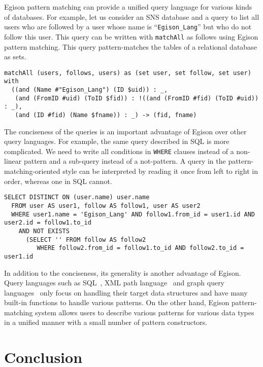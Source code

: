\documentclass{article}
\begin{document}
Egison pattern matching can provide a unified query language for various kinds of databases.
For example, let us consider an SNS database and a query to list all users who are followed by a user whose name is ``\verb|Egison_Lang|'' but who do not follow this user.
This query can be written with \texttt{matchAll} as follows using Egison pattern matching.
This query pattern-matches the tables of a relational database as sets.

\begin{lstlisting}[language=egison]
matchAll (users, follows, users) as (set user, set follow, set user) with
  ((and (Name #"Egison_Lang") (ID $uid)) : _,
   (and (FromID #uid) (ToID $fid)) : !((and (FromID #fid) (ToID #uid)) : _),
   (and (ID #fid) (Name $fname)) : _) -> (fid, fname)
\end{lstlisting}

The conciseness of the queries is an important advantage of Egison over other query languages.
For example, the same query described in SQL is more complicated.
We need to write all conditions in \texttt{WHERE} clauses instead of a non-linear pattern and a sub-query instead of a not-pattern.
A query in the pattern-matching-oriented style can be interpreted by reading it once from left to right in order, whereas one in SQL cannot.

\begin{lstlisting}[language=egison]
SELECT DISTINCT ON (user.name) user.name
  FROM user AS user1, follow AS follow1, user AS user2
  WHERE user1.name = 'Egison_Lang' AND follow1.from_id = user1.id AND user2.id = follow1.to_id
    AND NOT EXISTS
      (SELECT '' FROM follow AS follow2
         WHERE follow2.from_id = follow1.to_id AND follow2.to_id = user1.id
\end{lstlisting}

In addition to the conciseness, its generality is another advantage of Egison.
Query languages such as SQL~\cite{chamberlin1974sequel}, XML path language~\cite{berglund2003xml} and graph query languages~\cite{perez2006semantics,rodriguez2015gremlin,neo4jManual} only focus on handling their target data structures and have many built-in functions to handle various patterns.
On the other hand, Egison pattern-matching system allows users to describe various patterns for various data types in a unified manner with a small number of pattern constructors.


\section{Conclusion}\label{conclusion}
\end{document}
